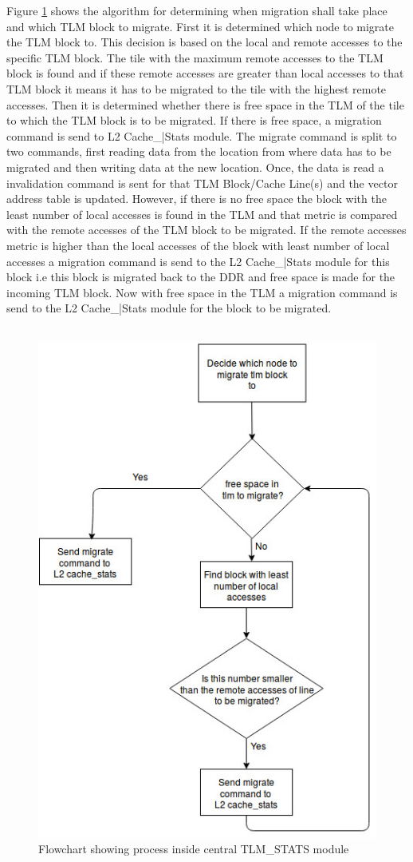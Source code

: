 \documentclass{listhesis}
\begin{document}
Figure \ref{fig:tlm_stats flowchart} shows the algorithm for determining when migration shall take place and which TLM block to migrate. First it is determined which node to migrate the TLM block to. This decision is based on the local and remote accesses to the specific TLM block. The tile with the maximum remote accesses to the TLM block is found and if these remote accesses are greater than local accesses to that TLM block it means it has to be migrated to the tile with the highest remote accesses. Then it is determined whether there is free space in the TLM of the tile to which the TLM block is to be migrated. If there is free space, a migration command is send to L2 Cache{\_|}Stats module. The migrate command is split to two commands, first reading data from the location from where data has to be migrated and then writing data at the new location. Once, the data is read a invalidation command is sent for that TLM Block/Cache Line(s) and the vector address table is updated. However, if there is no free space the block with the least number of local accesses is found in the TLM and that metric is compared with the remote accesses of the TLM block to be migrated. If the remote accesses metric is higher than the local accesses of the block with least number of local accesses a migration command is send to the L2 Cache{\_|}Stats module for this block i.e this block is migrated back to the DDR and free space is made for the incoming TLM block. Now with free space in the TLM a migration command is send to the  L2 Cache{\_|}Stats module for the block to be migrated.\\
\\
\begin{figure}
  \includegraphics[width=0.7\linewidth]{tlm_stats(1).jpg}
  \centering
  \caption{Flowchart showing process inside central TLM{\_}STATS module}
  \label{fig:tlm_stats flowchart}
\end{figure}
\end{document}

